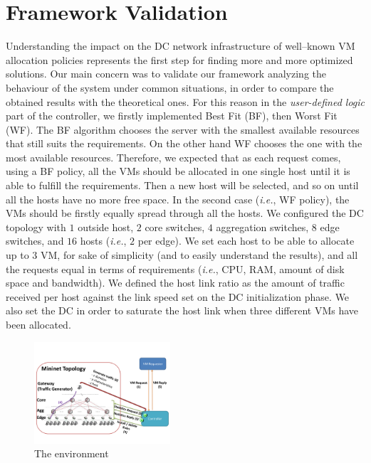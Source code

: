 \documentclass[12pt,english,oneside]{book}
\begin{document}
\section{Framework Validation}

Understanding the impact on the DC network infrastructure of well--known VM allocation policies represents the first step for finding more and more optimized solutions. Our main concern was to validate our framework analyzing the behaviour of the system under common situations, in order to compare the obtained results with the theoretical ones. For this reason in the \textit{user-defined logic} part of the controller, we firstly implemented Best Fit (BF), then Worst Fit (WF). The BF algorithm chooses the server with the smallest available resources that still suits the requirements. On the other hand WF chooses the one with the most available resources. Therefore, we expected that as each request comes, using a BF policy, all the VMs should be allocated in one single host until it is able to fulfill the requirements. Then a new host will be selected, and so on until all the hosts have no more free space. In the second case (\textit{i.e.}, WF policy), the VMs should be firstly equally spread through all 
the hosts. We configured the DC topology with $1$ outside host, $2$ core switches, $4$ aggregation switches, $8$ edge switches, and $16$ hosts (\textit{i.e.}, $2$ per edge). We set each host to be able to allocate up to $3$ VM, for sake of simplicity (and to easily understand the results), and all the requests equal in terms of requirements (\textit{i.e.}, CPU, RAM, amount of disk space and bandwidth). We defined the host link ratio as the amount of traffic received per host against the link speed set on the DC initialization phase. We also set the DC in order to saturate the host link when three different VMs have been allocated.

\begin{figure}[h!tbp]
        \centering
        \includegraphics[width=0.45\textwidth]{figures/figure1.pdf}
        \caption{The environment}
        \label{fig:use_case}
\end{figure}
\end{document}
